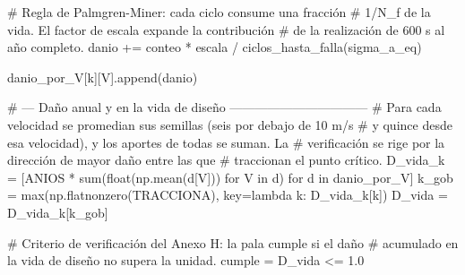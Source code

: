 \begin{pycode}
            # Regla de Palmgren-Miner: cada ciclo consume una fracción
            # 1/N_f de la vida. El factor de escala expande la contribución
            # de la realización de 600 s al año completo.
            danio += conteo * escala / ciclos_hasta_falla(sigma_a_eq)

        danio_por_V[k][V].append(danio)

# --- Daño anual y en la vida de diseño ---------------------------------
# Para cada velocidad se promedian sus semillas (seis por debajo de 10 m/s
# y quince desde esa velocidad), y los aportes de todas se suman. La
# verificación se rige por la dirección de mayor daño entre las que
# traccionan el punto crítico.
D_vida_k = [ANIOS * sum(float(np.mean(d[V])) for V in d) for d in danio_por_V]
k_gob    = max(np.flatnonzero(TRACCIONA), key=lambda k: D_vida_k[k])
D_vida   = D_vida_k[k_gob]

# Criterio de verificación del Anexo H: la pala cumple si el daño
# acumulado en la vida de diseño no supera la unidad.
cumple = D_vida <= 1.0
\end{pycode}
